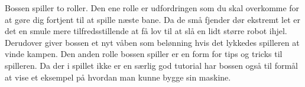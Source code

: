 Bossen spiller to roller. Den ene rolle er udfordringen som du skal
overkomme for at gøre dig fortjent til at spille næste bane. Da de små
fjender dør ekstremt let er det en smule mere tilfredsstillende at få
lov til at slå en lidt større robot ihjel. Derudover giver bossen et
nyt våben som belønning hvis det lykkedes spilleren at vinde kampen.
Den anden rolle bossen spiller er en form for tips og tricks til
spilleren. Da der i spillet ikke er en særlig god tutorial har bossen
også til formål at vise et eksempel på hvordan man kunne bygge sin
maskine.


